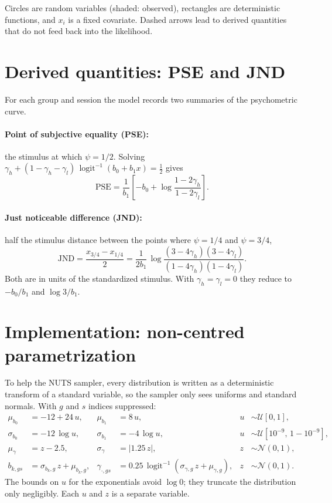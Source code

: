 \documentclass[11pt]{article}
\newcommand{\invlogit}{\operatorname{logit}^{-1}}
\begin{document}
\noindent
Circles are random variables (shaded: observed), rectangles are deterministic
functions, and $x_i$ is a fixed covariate. Dashed arrows lead to derived
quantities that do not feed back into the likelihood.

\section{Derived quantities: PSE and JND}

For each group and session the model records two summaries of the psychometric
curve.

\paragraph{Point of subjective equality (PSE):} the stimulus at which
$\psi = 1/2$. Solving
$\gamma_h + (1-\gamma_h-\gamma_l)\,\invlogit(b_0+b_1x) = \tfrac12$ gives
\[
  \text{PSE} = \frac{1}{b_1}\left[-b_0 + \log\frac{1-2\gamma_h}{1-2\gamma_l}\right].
\]

\paragraph{Just noticeable difference (JND):} half the stimulus distance between
the points where $\psi = 1/4$ and $\psi = 3/4$,
\[
  \text{JND} = \frac{x_{3/4} - x_{1/4}}{2}
  = \frac{1}{2b_1}\,\log\frac{(3-4\gamma_h)(3-4\gamma_l)}{(1-4\gamma_h)(1-4\gamma_l)} .
\]
Both are in units of the standardized stimulus. With
$\gamma_h=\gamma_l=0$ they reduce to $-b_0/b_1$ and $\log 3 / b_1$.

\section{Implementation: non-centred parametrization}

To help the NUTS sampler, every distribution is written as a deterministic
transform of a standard variable, so the sampler only sees uniforms and
standard normals. With $g$ and $s$ indices suppressed:
\begin{align*}
  \mu_{b_0} &= -12 + 24\,u, & \mu_{b_1} &= 8\,u, & u &\sim \mathcal{U}[0,1], \\
  \sigma_{b_0} &= -12\,\log u, & \sigma_{b_1} &= -4\,\log u, & u &\sim \mathcal{U}[10^{-9},\,1-10^{-9}], \\
  \mu_{\gamma} &= z - 2.5, & \sigma_{\gamma} &= |1.25\,z|, & z &\sim \mathcal{N}(0,1), \\
  b_{k,gs} &= \sigma_{b_k,g}\, z + \mu_{b_k,g}, &
  \gamma_{\cdot,gs} &= 0.25\,\invlogit(\sigma_{\gamma,g}\, z + \mu_{\gamma,g}), &
  z &\sim \mathcal{N}(0,1).
\end{align*}
The bounds on $u$ for the exponentials avoid $\log 0$; they truncate the
distribution only negligibly. Each $u$ and $z$ is a separate variable.
\end{document}

